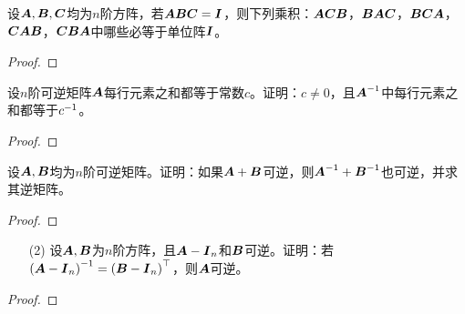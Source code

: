 \begin{problem}
设\(\boldsymbol{A},\boldsymbol{B},\boldsymbol{C}\)均为\(n\)阶方阵，若\(\boldsymbol{A}\boldsymbol{B}\boldsymbol{C}=\boldsymbol{I}\)，则下列乘积：\(\boldsymbol{A}\boldsymbol{C}\boldsymbol{B}\)，\(\boldsymbol{B}\boldsymbol{A}\boldsymbol{C}\)，\(\boldsymbol{B}\boldsymbol{C}\boldsymbol{A}\)，\(\boldsymbol{C}\boldsymbol{A}\boldsymbol{B}\)，\(\boldsymbol{C}\boldsymbol{B}\boldsymbol{A}\)中哪些必等于单位阵\(\boldsymbol{I}\)。
\end{problem}
\begin{proof}

\end{proof}

\setcounter{problem}{43}
\begin{problem}
设\(n\)阶可逆矩阵\(\boldsymbol{A}\)每行元素之和都等于常数\(c\)。证明：\(c\neq0\)，且\({\boldsymbol{A}}^{-1}\)中每行元素之和都等于\({c}^{-1}\)。
\end{problem}
\begin{proof}

\end{proof}

\setcounter{problem}{45}
\begin{problem}
设\(\boldsymbol{A},\boldsymbol{B}\)均为\(n\)阶可逆矩阵。证明：如果\(\boldsymbol{A}+\boldsymbol{B}\)可逆，则\({\boldsymbol{A}}^{-1}+{\boldsymbol{B}}^{-1}\)也可逆，并求其逆矩阵。
\end{problem}
\begin{proof}

\end{proof}

\begin{problem}
\begin{enumerate}
    \item[(2)]
        {
        设\(\boldsymbol{A},\boldsymbol{B}\)为\(n\)阶方阵，且\(\boldsymbol{A}-\boldsymbol{I}_n\)和\(\boldsymbol{B}\)可逆。证明：若\({\left( \boldsymbol{A}-\boldsymbol{I}_n \right)}^{-1}=\left( \boldsymbol{B}-\boldsymbol{I}_n \right)^\top\)，则\(\boldsymbol{A}\)可逆。
        }
\end{enumerate}
\end{problem}
\begin{proof}

\end{proof}